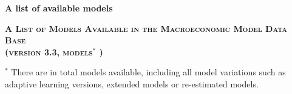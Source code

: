 \documentclass[11pt,a4paper]{article}
\begin{document}
	\begin{center}
		{\Large \textbf{A list of available models} }
		\par\end{center}
	
	
	
	
	
	\setcounter{NKnumber}{45}
	\setcounter{USnumber}{66}
	\setcounter{EAnumber}{20}
	\setcounter{MCnumber}{10}
	\setcounter{OCnumber}{9}
	\setcounter{ALnumber}{11}
	
	\setcounter{numbermodels}{
		\numexpr\value{NKnumber}+\numexpr\value{USnumber}+\numexpr\value{EAnumber}+\numexpr\value{MCnumber}+\numexpr\value{OCnumber}+\numexpr\value{ALnumber} \relax}
	
	
	
	
	\begin{center}
		\textsc{\textbf{A List of Models Available in the Macroeconomic Model Data Base} } \\
		\textsc{\textbf{(version 3.3, \the\value{numbermodels} models$^\ast$ )} }
	\end{center}
	\vfill
	
	\noindent \footnotesize $^\ast$ There are in total \the\value{numbermodels} models available, including all model variations such as adaptive learning versions, extended models or re-estimated models. 
	
	
	
\end{document}
